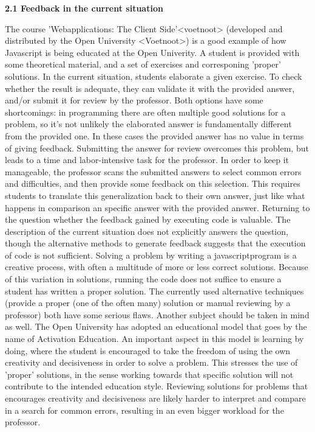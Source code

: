 \documentclass{article}
\begin{document}
\textbf{2.1 Feedback in the current situation}

\noindent
The course 'Webapplications: The Client Side'<voetnoot> (developed and distributed by the Open University <Voetnoot>) is a good example of how Javascript is being educated at the Open Univerity. A student is provided with some theoretical material, and a set of exercises and corresponing 'proper' solutions. In the current situation, students elaborate a given exercise. To check whether the result is adequate, they can validate it with the provided answer, and/or submit it for review by the professor. Both options have some shortcomings: in programming there are often multiple good solutions for a problem, so it’s not unlikely the elaborated answer is fundamentally different from the provided one. In these cases the provided answer has no value in terms of giving feedback. Submitting the answer for review overcomes this problem, but leads to a time and labor-intensive task for the professor. In order to keep it manageable, the professor scans the submitted answers to select common errors and difficulties, and then provide some feedback on this selection. This requires students to translate this generalization back to their own answer, just like what happens in comparison an specific answer with the provided answer.
\newline
Returning to the question whether the feedback gained by executing code is valuable. The description of the current situation does not explicitly answers the question, though the alternative methods to generate feedback suggests that the execution of code is not sufficient. Solving a problem by writing a javascriptprogram is a creative process, with often a multitude of more or less correct solutions. Because of this variation in solutions, running the code does not suffice to ensure a student has written a proper solution. The currently used alternative techniques (provide a proper (one of the often many) solution or manual reviewing by a professor) both have some serious flaws. 
\newline
Another subject should be taken in mind as well. The Open University has adopted an educational model that goes by the name of Activation Education. An important aspect in this model is learning by doing, where the student is encouraged to take the freedom of using the own creativity and decisiveness in order to solve a problem. This stresses the use of 'proper' solutions, in the sense working towards that specific solution will not contribute to the intended education style. Reviewing solutions for problems that encourages creativity and decisiveness are likely harder to interpret and compare in a search for common errors, resulting in an even bigger workload for the professor. 
\end{document}

